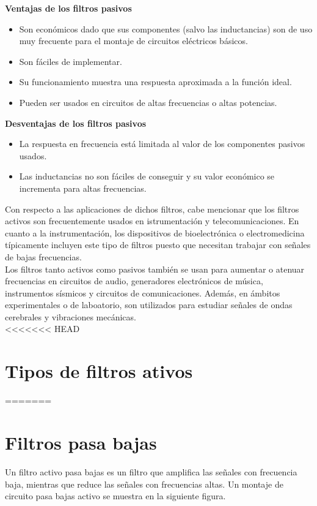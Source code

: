 \documentclass[prb,aps,preprintnumbers,amsmath,amssymb]{revtex4}
\begin{document}
\textbf{Ventajas de los filtros pasivos}

\begin{itemize}
	\item Son económicos dado que sus componentes (salvo las inductancias) son de uso muy frecuente para el montaje de circuitos eléctricos básicos.
	
	\item Son fáciles de implementar.
	
	\item Su funcionamiento muestra una respuesta aproximada a la función ideal.
	
	\item Pueden ser usados en circuitos de altas frecuencias o altas potencias.
\end{itemize}

\textbf{Desventajas de los filtros pasivos}

\begin{itemize}
	\item La respuesta en frecuencia está limitada al valor de los componentes pasivos usados.
	
	\item Las inductancias no son fáciles de conseguir y su valor económico se incrementa para altas frecuencias.
\end{itemize}

Con respecto a las aplicaciones de dichos filtros, cabe mencionar que los filtros activos son frecuentemente usados en istrumentación y telecomunicaciones. En cuanto a la instrumentación, los dispositivos de bioelectrónica o electromedicina típicamente incluyen este tipo de filtros puesto que necesitan trabajar con señales de bajas frecuencias. \\

Los filtros tanto activos como pasivos también se usan para aumentar o atenuar frecuencias en circuitos de audio, generadores electrónicos de música, instrumentos sísmicos y circuitos de comunicaciones. Además, en ámbitos experimentales o de laboatorio, son utilizados para estudiar señales de ondas cerebrales y vibraciones mecánicas.\\

<<<<<<< HEAD
\section{Tipos de filtros ativos}

=======
\section{Filtros pasa bajas}
Un filtro activo pasa bajas es un filtro que amplifica las señales con frecuencia baja, mientras que reduce las señales con frecuencias altas. Un montaje de circuito pasa bajas activo se muestra en la siguiente figura.\\
\end{document}
